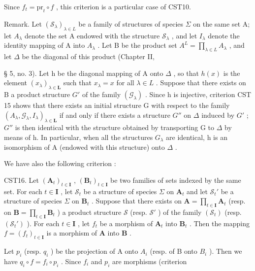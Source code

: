 Since \(f_{t} = \mathrm{pr}_{t} \circ f\) , this criterion is a particular case of CST10.

Remark. Let \((\mathcal{S}_{\lambda})_{\lambda \in L}\) be a family of structures of species \(\Sigma\) on the same set A; let \(A_{\lambda}\) denote the set A endowed with the structure \(\mathcal{S}_{\lambda}\) , and let \(I_{\lambda}\) denote the identity mapping of A into \(A_{\lambda}\) . Let B be the product set \(A^{L} = \prod_{\lambda \in L} A_{\lambda}\) , and let \(\Delta\) be the diagonal of this product (Chapter II,

§ 5, no. 3). Let h be the diagonal mapping of A onto \(\Delta\) , so that \(h(x)\) is the element \((x_{\lambda})_{\lambda\in\mathbf{L}}\) such that \(x_{\lambda}=x\) for all \(\lambda\in L\) . Suppose that there exists on B a product structure \(G'\) of the family \((\mathcal{G}_{\lambda})\) . Since h is injective, criterion CST 15 shows that there exists an initial structure G with respect to the family \((A_{\lambda},\mathcal{G}_{\lambda},I_{\lambda})_{\lambda\in\mathbf{L}}\) if and only if there exists a structure \(G''\) on \(\Delta\) induced by \(G'\) ; \(G''\) is then identical with the structure obtained by transporting G to \(\Delta\) by means of h. In particular, when all the structures \(G_{\lambda}\) are identical, h is an isomorphism of A (endowed with this structure) onto \(\Delta\) .

We have also the following criterion :

CST16. Let \((\mathbf{A}_t)_{t \in \mathbf{I}}\) , \((\mathbf{B}_t)_{t \in \mathbf{I}}\) be two families of sets indexed by the same set. For each \(t \in \mathbf{I}\) , let \(\mathcal{S}_t\) be a structure of species \(\Sigma\) on \(\mathbf{A}_t\) and let \(\mathcal{S}_t'\) be a structure of species \(\Sigma\) on \(\mathbf{B}_t\) . Suppose that there exists on \(\mathbf{A} = \prod_{t \in \mathbf{I}} \mathbf{A}_t\) (resp. on \(\mathbf{B} = \prod_{t \in \mathbf{I}} \mathbf{B}_t\) ) a product structure \(\mathcal{S}\) (resp. \(\mathcal{S}'\) ) of the family \((\mathcal{S}_t)\) (resp. \((\mathcal{S}_t')\) ). For each \(t \in \mathbf{I}\) , let \(f_t\) be a morphism of \(\mathbf{A}_t\) into \(\mathbf{B}_t\) . Then the mapping \(f = (f_t)_{t \in \mathbf{I}}\) is a morphism of \(\mathbf{A}\) into \(\mathbf{B}\) .

Let \(p_{i}\) (resp. \(q_{i}\) ) be the projection of A onto \(A_{i}\) (resp. of B onto \(B_{i}\) ). Then we have \(q_{i} \circ f = f_{i} \circ p_{i}\) . Since \(f_{i}\) and \(p_{i}\) are morphisms (criterion

